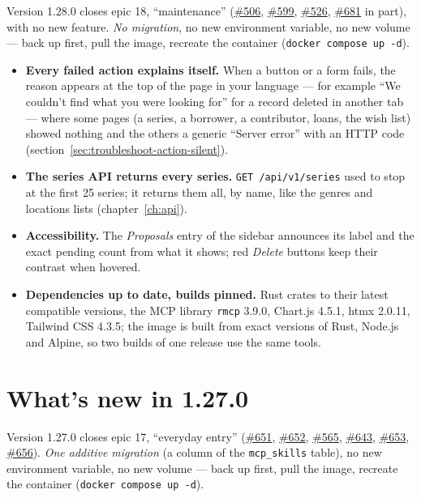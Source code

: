 Version 1.28.0 closes epic 18, ``maintenance''
(\href{https://github.com/guycorbaz/mybibli/issues/506}{\#506},
\href{https://github.com/guycorbaz/mybibli/issues/599}{\#599},
\href{https://github.com/guycorbaz/mybibli/issues/526}{\#526},
\href{https://github.com/guycorbaz/mybibli/issues/681}{\#681} in part),
with no new feature. \emph{No migration}, no new environment variable,
no new volume --- back up first, pull the image, recreate the container
(\texttt{docker compose up -d}).

\begin{itemize}
  \item \textbf{Every failed action explains itself.} When a button or a
        form fails, the reason appears at the top of the page in your
        language --- for example ``We couldn't find what you were
        looking for'' for a record deleted in another tab --- where some
        pages (a series, a borrower, a contributor, loans, the wish
        list) showed nothing and the others a generic ``Server error''
        with an HTTP code (section~\ref{sec:troubleshoot-action-silent}).
  \item \textbf{The series API returns every series.}
        \texttt{GET /api/v1/series} used to stop at the first 25 series;
        it returns them all, by name, like the genres and locations
        lists (chapter~\ref{ch:api}).
  \item \textbf{Accessibility.} The \emph{Proposals} entry of the
        sidebar announces its label and the exact pending count from
        what it shows; red \emph{Delete} buttons keep their contrast
        when hovered.
  \item \textbf{Dependencies up to date, builds pinned.} Rust crates to
        their latest compatible versions, the MCP library \texttt{rmcp}
        3.9.0, Chart.js 4.5.1, htmx 2.0.11, Tailwind CSS 4.3.5; the image
        is built from exact versions of Rust, Node.js and Alpine, so two
        builds of one release use the same tools.
\end{itemize}

\section{What's new in 1.27.0}\label{sec:whats-new-1.27.0}

Version 1.27.0 closes epic 17, ``everyday entry''
(\href{https://github.com/guycorbaz/mybibli/issues/651}{\#651},
\href{https://github.com/guycorbaz/mybibli/issues/652}{\#652},
\href{https://github.com/guycorbaz/mybibli/issues/565}{\#565},
\href{https://github.com/guycorbaz/mybibli/issues/643}{\#643},
\href{https://github.com/guycorbaz/mybibli/issues/653}{\#653},
\href{https://github.com/guycorbaz/mybibli/issues/656}{\#656}).
\emph{One additive migration} (a column of the \texttt{mcp\_skills}
table), no new environment variable, no new volume --- back up first,
pull the image, recreate the container (\texttt{docker compose up -d}).

